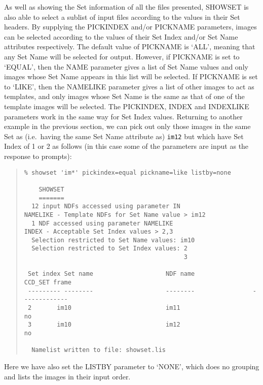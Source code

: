\documentclass[twoside,11pt]{article}
\newcommand{\latexhtml}[2]{#1}
\renewcommand{\_}{\texttt{\symbol{95}}}
\newcommand{\ttsize}{\latexhtml{\small}{}}
\newenvironment{myquote}{\begin{quote}\ttsize}{\end{quote}}
\newcommand{\text}[1]{{\ttsize \tt #1}}
\newcommand{\routine}[1]{{\sc #1}}
\begin{document}
As well as showing the Set information of all the files presented,
\routine{SHOWSET} is also able to 
select a sublist of input files according to the values in their
Set headers.  
By supplying the PICKINDEX and/or PICKNAME parameters,
images can be selected according
to the values of their Set Index and/or Set Name attributes
respectively.
The default value of PICKNAME is `ALL', meaning that any Set Name
will be selected for output.
However, if PICKNAME is set to `EQUAL', then the
NAME parameter gives a list of Set Name values and only
images whose Set Name appears in this list will be selected.
If PICKNAME is set to `LIKE', then the
NAMELIKE parameter gives a list of other images to act as templates,
and only images whose Set Name is the same as that of one of the template
images will be selected.
The PICKINDEX, INDEX and INDEXLIKE parameters work in the same way
for Set Index values.
Returning to another example in the previous section, 
we can pick out only those images in the same Set as (i.e.\ having
the same Set Name attribute as) \text{im12}
but which have Set Index of 1 or 2 as follows 
(in this case some of the parameters are input as the response to prompts):
\begin{myquote}
\begin{verbatim}
% showset 'im*' pickindex=equal pickname=like listby=none

    SHOWSET
    =======
  12 input NDFs accessed using parameter IN
NAMELIKE - Template NDFs for Set Name value > im12
  1 NDF accessed using parameter NAMELIKE
INDEX - Acceptable Set Index values > 2,3
  Selection restricted to Set Name values: im10
  Selection restricted to Set Index values: 2
                                            3

 Set index Set name                    NDF name                CCD_SET frame
 --------- --------                    --------                -------------
 2       im10                          im11                          no
 3       im10                          im12                          no

  Namelist written to file: showset.lis
\end{verbatim}
\end{myquote}
Here we have also set the LISTBY parameter to `NONE', which does
no grouping and lists the images in their input order.
\end{document}
